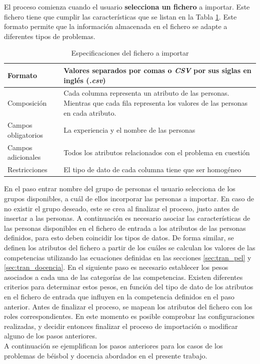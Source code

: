 El proceso comienza cuando el usuario \textbf{selecciona un fichero} a importar. Este fichero tiene que cumplir las características que se listan en la Tabla \ref{table:especificaciones-fichero}. Este formato permite que la información almacenada en el fichero se adapte a diferentes tipos de problemas.

\begin{table}[H]
	\centering
	\caption{Especificaciones del fichero a importar}\label{table:especificaciones-fichero}
	\begin{tabular} {l | p{10cm}}
		\toprule
		Formato & Valores separados por comas o \textit{CSV} por sus siglas en inglés (\textit{.csv}) \\ \midrule
		Composición & Cada columna representa un atributo de las personas. Mientras que cada fila representa los valores de las personas en cada atributo. \\ \hline
		Campos obligatorios & La experiencia y el nombre de las personas \\ \hline
		Campos adicionales & Todos los atributos relacionados con el problema en cuestión \\ \hline 
		Restricciones & El tipo de dato de cada columna tiene que ser homogéneo \\ \bottomrule
	\end{tabular}
\end{table}

En el paso entrar nombre del grupo de personas el usuario selecciona de los grupos disponibles, a cuál de ellos incorporar las personas a importar. En caso de no existir el grupo deseado, este se crea al finalizar el proceso, justo antes de insertar a las personas. A continuación es necesario asociar las características de las personas disponibles en el fichero de entrada a los atributos de las personas definidos, para esto deben coincidir los tipos de datos. De forma similar, se definen los atributos del fichero a partir de los cuáles se calculan los valores de las competencias utilizando las ecuaciones definidas en las secciones \ref{sec:tran_pel} y \ref{sec:tran_docencia}. En el siguiente paso es necesario establecer los pesos asociados a cada una de las categorías de las competencias. Existen diferentes criterios para determinar estos pesos, en función del tipo de dato de los atributos en el fichero de entrada que influyen en la competencia definidos en el paso anterior. Antes de finalizar el proceso, se mapean los atributos del fichero con los roles correspondientes. En este momento es posible comprobar las configuraciones realizadas, y decidir entonces finalizar el proceso de importación o modificar alguno de los pasos anteriores. \\
A continuación se ejemplifican los pasos anteriores para los casos de los problemas de béisbol y docencia abordados en el presente trabajo.

